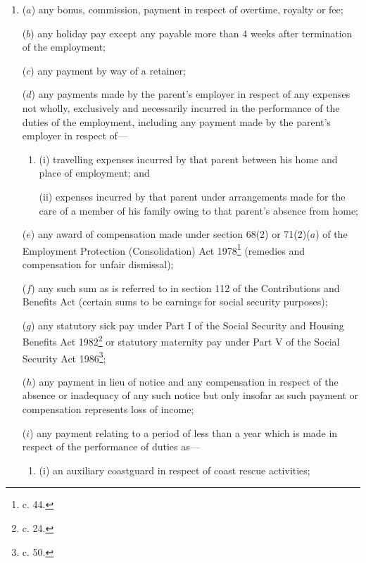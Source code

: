 \documentclass[a4paper]{article}
\begin{document}
\begin{enumerate}\item[]
($a$) any bonus, commission, 
payment in respect of overtime,  %
royalty or fee;

($b$) any holiday pay except any payable more than 4 weeks after termination of the employment;

($c$) any payment by way of a retainer;


($d$) any payments made by the parent’s employer in respect of any expenses not wholly, exclusively and necessarily incurred in the performance of the duties of the employment, including any payment made by the parent’s employer in respect of—
\begin{enumerate}\item[]
(i) travelling expenses incurred by that parent between his home and place of employment; and

(ii) expenses incurred by that parent under arrangements made for the care of a member of his family owing to that parent’s absence from home;
\end{enumerate}

($e$) any award of compensation made under section 68(2) or 71(2)($a$) of the Employment Protection (Consolidation) Act 1978\footnote{ c. 44.} (remedies and compensation for unfair dismissal);

($f$) any such sum as is referred to in section 112 of the Contributions and Benefits Act (certain sums to be earnings for social security purposes);

($g$) any statutory sick pay under Part I of the Social Security and Housing Benefits Act 1982\footnote{ c. 24.} or statutory maternity pay under Part V of the Social Security Act 1986\footnote{ c. 50.};

($h$) any payment in lieu of notice and any compensation in respect of the absence or inadequacy of any such notice but only insofar as such payment or compensation represents loss of income;

($i$) any payment relating to a period of less than a year which is made in respect of the performance of duties as—
\begin{enumerate}\item[]
(i) an auxiliary coastguard in respect of coast rescue activities;


\end{enumerate}
\end{enumerate}
\end{document}

